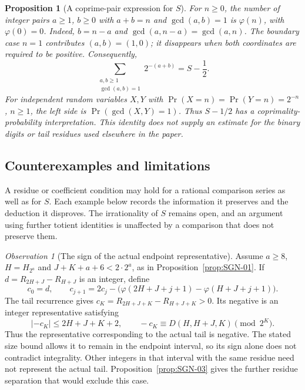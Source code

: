 \documentclass[11pt]{article}
\theoremstyle{plain}
\newtheorem{prop}[thm]{Proposition}
\theoremstyle{definition}
\theoremstyle{remark}
\newtheorem{obs}[thm]{Observation}
\newcommand{\lean}[2]{\leanlink{#2}}
\begin{document}
\begin{prop}[A coprime-pair expression for $S$]\label{prop:C1-inv}
For $n\ge0$, the number of integer pairs $a\ge1$, $b\ge0$ with
$a+b=n$ and $\gcd(a,b)=1$ is $\varphi(n)$, with
$\varphi(0)=0$. Indeed, $b=n-a$ and
$\gcd(a,n-a)=\gcd(a,n)$. The boundary case $n=1$ contributes
$(a,b)=(1,0)$; it disappears when both coordinates are required to
be positive. Consequently,
\[
 \sum_{\substack{a,b\ge1\\\gcd(a,b)=1}}2^{-(a+b)}=S-\frac12.
\]
For independent random variables $X,Y$ with
$\Pr(X=n)=\Pr(Y=n)=2^{-n}$, $n\ge1$, the left side is
$\Pr(\gcd(X,Y)=1)$. Thus $S-1/2$ has a coprimality-probability
interpretation. This identity does not supply an estimate for the
binary digits or tail residues used elsewhere in the paper.
\end{prop}

\subsection{Counterexamples and limitations}

A residue or coefficient condition may hold for a rational comparison
series as well as for $S$. Each example below records the information
it preserves and the deduction it disproves. The irrationality of $S$
remains open, and an argument using further totient identities is
unaffected by a comparison that does not preserve them.


\begin{obs}[The sign of the actual endpoint representative]\label{prop:SGN-02}
Assume $a\ge8$, $H=H_{2^a}$ and
$J+K+a+6<2\cdot2^a$, as in
Proposition~\ref{prop:SGN-01}. If
$d=R_{2H+J}-R_{H+J}$ is an integer, define
\[
 c_0=d,\qquad
 c_{j+1}=2c_j-\bigl(\varphi(2H+J+j+1)-\varphi(H+J+j+1)\bigr).
\]
The tail recurrence gives
$c_K=R_{2H+J+K}-R_{H+J+K}>0$. Its negative is an integer
representative satisfying
\[
 |{-c_K}|\le2H+J+K+2,\qquad
 -c_K\equiv D(H,H+J,K)\pmod{2^K}.
\]
Thus the representative corresponding to the actual tail is negative.
The stated size bound allows it to remain in the endpoint interval,
so its sign alone does not contradict integrality. Other integers in
that interval with the same residue need not represent the actual tail.
Proposition~\ref{prop:SGN-03} gives the further residue separation
that would exclude this case.
\lean{actualLcm_trueEndpointSurvivor_neg}{TotientActualLcmOrbitSign.lean:172}
\end{obs}
\end{document}
